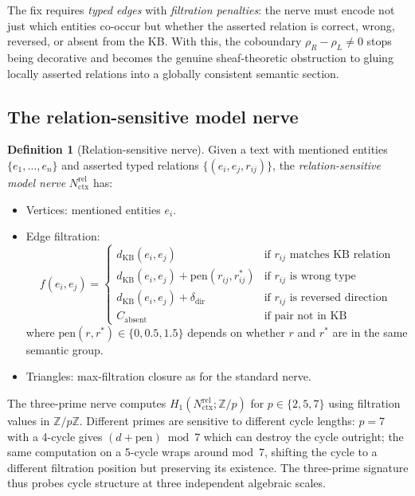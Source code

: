 \documentclass[11pt]{amsart}
\theoremstyle{definition}
\newtheorem{definition}[theorem]{Definition}
\newcommand{\Nctx}{N_{\mathrm{ctx}}}
\newcommand{\rhoR}{\rho_R}
\newcommand{\rhoL}{\rho_L}
\begin{document}
The fix requires \emph{typed edges} with \emph{filtration penalties}:
the nerve must encode not just which entities co-occur but whether
the asserted relation is correct, wrong, reversed, or absent from the KB.
With this, the coboundary $\rhoR - \rhoL \neq 0$ stops being decorative
and becomes the genuine sheaf-theoretic obstruction to gluing locally
asserted relations into a globally consistent semantic section.

\subsection{The relation-sensitive model nerve}

\begin{definition}[Relation-sensitive nerve]
\label{def:rel-nerve}
Given a text with mentioned entities $\{e_1, \ldots, e_n\}$ and
asserted typed relations $\{(e_i, e_j, r_{ij})\}$, the
\emph{relation-sensitive model nerve} $\Nctx^{\mathrm{rel}}$ has:
\begin{itemize}
\item Vertices: mentioned entities $e_i$.
\item Edge filtration:
  \[
    f(e_i, e_j) = \begin{cases}
      d_{\mathrm{KB}}(e_i,e_j) & \text{if } r_{ij} \text{ matches KB relation} \\
      d_{\mathrm{KB}}(e_i,e_j) + \mathrm{pen}(r_{ij}, r^*_{ij}) & \text{if } r_{ij} \text{ is wrong type} \\
      d_{\mathrm{KB}}(e_i,e_j) + \delta_{\mathrm{dir}} & \text{if } r_{ij} \text{ is reversed direction} \\
      C_{\mathrm{absent}} & \text{if pair not in KB}
    \end{cases}
  \]
  where $\mathrm{pen}(r, r^*) \in \{0, 0.5, 1.5\}$ depends on whether
  $r$ and $r^*$ are in the same semantic group.
\item Triangles: max-filtration closure as for the standard nerve.
\end{itemize}
\end{definition}

The three-prime nerve computes $H_1(\Nctx^{\mathrm{rel}}; \mathbb{Z}/p)$
for $p \in \{2, 5, 7\}$ using filtration values in $\mathbb{Z}/p\mathbb{Z}$.
Different primes are sensitive to different cycle lengths:
$p=7$ with a 4-cycle gives $(d+\mathrm{pen}) \bmod 7$ which can destroy
the cycle outright; the same computation on a 5-cycle wraps around
mod~7, shifting the cycle to a different filtration position but
preserving its existence.
The three-prime signature thus probes cycle structure at three
independent algebraic scales.
\end{document}
